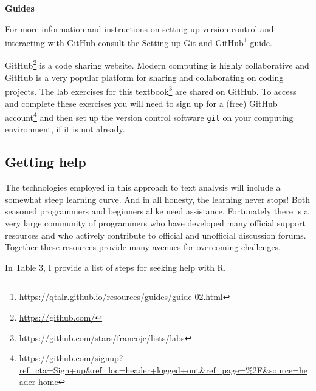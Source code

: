 \documentclass[
  letterpaper,
]{latex/krantz}
\theoremstyle{definition}
\theoremstyle{remark}
\DeclareRobustCommand{\href}[2]{#2\footnote{\url{#1}}}
\begin{document}
\begin{tcolorbox}[enhanced jigsaw, breakable, leftrule=.75mm, arc=.35mm, colframe=quarto-callout-color-frame, colback=white, left=2mm, bottomrule=.15mm, rightrule=.15mm, toprule=.15mm, opacityback=0]

\textbf{ Guides}

For more information and instructions on setting up version control and
interacting with GitHub consult the
\href{https://qtalr.github.io/resources/guides/guide-02.html}{Setting up
Git and GitHub} guide.

\end{tcolorbox}

\href{https://github.com/}{GitHub} is a code sharing website. Modern
computing is highly collaborative and GitHub is a very popular platform
for sharing and collaborating on coding projects. The
\href{https://github.com/stars/francojc/lists/labs}{lab exercises for
this textbook} are shared on GitHub. To access and complete these
exercises you will need to
\href{https://github.com/signup?ref_cta=Sign+up&ref_loc=header+logged+out&ref_page=\%2F&source=header-home}{sign
up for a (free) GitHub account} and then set up the version control
software \texttt{git} on your computing environment, if it is not
already.

\subsection*{Getting help}\label{sec-p-getting-help}

The technologies employed in this approach to text analysis will include
a somewhat steep learning curve. And in all honesty, the learning never
stops! Both seasoned programmers and beginners alike need assistance.
Fortunately there is a very large community of programmers who have
developed many official support resources and who actively contribute to
official and unofficial discussion forums. Together these resources
provide many avenues for overcoming challenges.

In Table 3, I provide a list of steps for seeking help with R.
\end{document}
